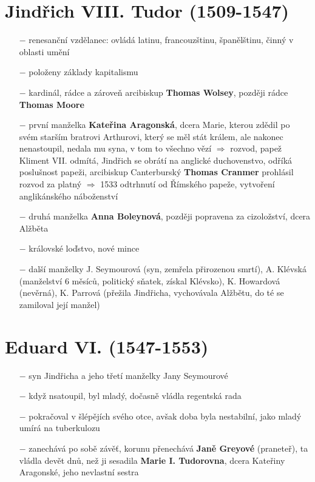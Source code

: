 \documentclass{article}
\begin{document}
\section*{Jindřich VIII. Tudor (1509-1547)}
\begin{itemize}
    \vspace{-0.5em}
    \setlength\itemsep{0.15em}
    \item[$-$] renesanční vzdělanec: ovládá latinu, francouzštinu, španělštinu, činný v oblasti umění
    \item[$-$] položeny základy kapitalismu
    \item[$-$] kardinál, rádce a zároveň arcibiskup \textbf{Thomas Wolsey}, později rádce \textbf{Thomas Moore}
    \item[$-$] první manželka \textbf{Kateřina Aragonská}, dcera Marie, kterou zdědil po svém starším bratrovi Arthurovi, který se měl stát králem, ale nakonec nenastoupil, nedala mu syna, v tom to všechno vězí $\Rightarrow$ rozvod, papež Kliment VII. odmítá, Jindřich se obrátí na anglické duchovenstvo, odříká poslušnost papeži, arcibiskup Canterburský \textbf{Thomas Cranmer} prohlásil rozvod za platný $\Rightarrow$ 1533 odtrhnutí od Římského papeže, vytvoření anglikánského náboženství
    \item[$-$] druhá manželka \textbf{Anna Boleynová}, později popravena za cizoložství, dcera Alžběta
    \item[$-$] královské loďstvo, nové mince
    \item[$-$] další manželky J. Seymourová (syn, zemřela přirozenou smrtí), A. Klévská (manželství 6 měsíců, politický sňatek, získal Klévsko), K. Howardová (nevěrná), K. Parrová (přežila Jindřicha, vychovávala Alžbětu, do té se zamiloval její manžel)
\end{itemize}

\section*{Eduard VI. (1547-1553)}
\begin{itemize}
    \vspace{-0.5em}
    \setlength\itemsep{0.15em}
    \item[$-$] syn Jindřicha a jeho třetí manželky Jany Seymourové
    \item[$-$] když nsatoupil, byl mladý, dočasně vládla regentská rada
    \item[$-$] pokračoval v šlépějích svého otce, avšak doba byla nestabilní, jako mladý umírá na tuberkulozu
    \item[$-$] zanechává po sobě závěť, korunu přenechává \textbf{Janě Greyové} (praneteř), ta vládla devět dnů, než ji sesadila \textbf{Marie I. Tudorovna}, dcera Kateřiny Aragonské, jeho nevlastní sestra

\end{itemize}
\end{document}
